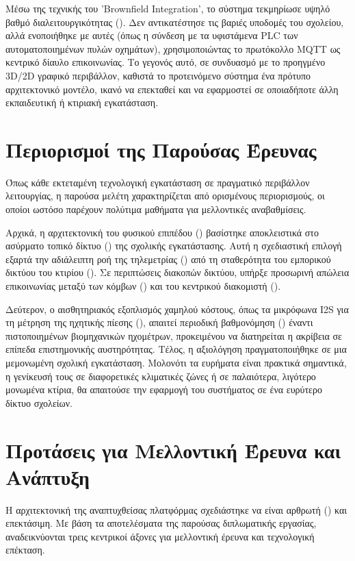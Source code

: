 Μέσω της τεχνικής του 'Brownfield Integration', το σύστημα τεκμηρίωσε υψηλό βαθμό διαλειτουργικότητας (). Δεν αντικατέστησε τις βαριές υποδομές του σχολείου, αλλά ενοποιήθηκε με αυτές (όπως η σύνδεση με τα υφιστάμενα PLC των αυτοματοποιημένων πυλών οχημάτων), χρησιμοποιώντας το πρωτόκολλο MQTT ως κεντρικό δίαυλο επικοινωνίας. Το γεγονός αυτό, σε συνδυασμό με το προηγμένο 3D/2D γραφικό περιβάλλον, καθιστά το προτεινόμενο σύστημα ένα πρότυπο αρχιτεκτονικό μοντέλο, ικανό να επεκταθεί και να εφαρμοστεί σε οποιαδήποτε άλλη εκπαιδευτική ή κτιριακή εγκατάσταση.

\section{Περιορισμοί της Παρούσας Έρευνας}
Όπως κάθε εκτεταμένη τεχνολογική εγκατάσταση σε πραγματικό περιβάλλον λειτουργίας, η παρούσα μελέτη χαρακτηρίζεται από ορισμένους περιορισμούς, οι οποίοι ωστόσο παρέχουν πολύτιμα μαθήματα για μελλοντικές αναβαθμίσεις.

Αρχικά, η αρχιτεκτονική του φυσικού επιπέδου () βασίστηκε αποκλειστικά στο ασύρματο τοπικό δίκτυο () της σχολικής εγκατάστασης. Αυτή η σχεδιαστική επιλογή εξαρτά την αδιάλειπτη ροή της τηλεμετρίας () από τη σταθερότητα του εμπορικού δικτύου του κτιρίου (). Σε περιπτώσεις διακοπών δικτύου, υπήρξε προσωρινή απώλεια επικοινωνίας μεταξύ των κόμβων () και του κεντρικού διακομιστή ().

Δεύτερον, ο αισθητηριακός εξοπλισμός χαμηλού κόστους, όπως τα μικρόφωνα I2S για τη μέτρηση της ηχητικής πίεσης (), απαιτεί περιοδική βαθμονόμηση () έναντι πιστοποιημένων βιομηχανικών ηχομέτρων, προκειμένου να διατηρείται η ακρίβεια σε επίπεδα επιστημονικής αυστηρότητας. Τέλος, η αξιολόγηση πραγματοποιήθηκε σε μια μεμονωμένη σχολική εγκατάσταση. Μολονότι τα ευρήματα είναι πρακτικά σημαντικά, η γενίκευσή τους σε διαφορετικές κλιματικές ζώνες ή σε παλαιότερα, λιγότερο μονωμένα κτίρια, θα απαιτούσε την εφαρμογή του συστήματος σε ένα ευρύτερο δίκτυο σχολείων.

\section{Προτάσεις για Μελλοντική Έρευνα και Ανάπτυξη}
Η αρχιτεκτονική της αναπτυχθείσας πλατφόρμας σχεδιάστηκε να είναι αρθρωτή () και επεκτάσιμη. Με βάση τα αποτελέσματα της παρούσας διπλωματικής εργασίας, αναδεικνύονται τρεις κεντρικοί άξονες για μελλοντική έρευνα και τεχνολογική επέκταση.

